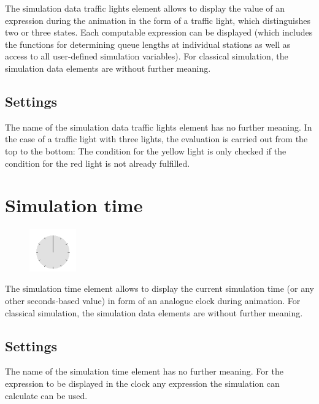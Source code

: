 The simulation data traffic lights element allows to display the value of an expression during the animation
in the form of a traffic light, which distinguishes two or three states. Each computable expression can be
displayed (which includes the functions for determining queue lengths at individual stations as well as
access to all user-defined simulation variables). For classical simulation, the simulation data elements
are without further meaning.

\subsection*{Settings}

The name of the simulation data traffic lights element has no further meaning.
In the case of a traffic light with three lights, the evaluation is carried out from the top to the bottom:
The condition for the yellow light is only checked if the condition for the red light is not already fulfilled.


\section{Simulation time}
\label{ref:ModelElementAnimationClock}

\begin{figure}
\vspace{-22pt}
\includegraphics[width=2cm]{imageModelElementAnimationClock.png}
\vspace{-22pt}
\end{figure}

The simulation time element allows to display the current simulation time
(or any other seconds-based value) in form of an analogue clock during animation.
For classical simulation, the simulation data elements are without further meaning.

\subsection*{Settings}

The name of the simulation time element has no further meaning.
For the expression to be displayed in the clock any expression the simulation can calculate can be used.


